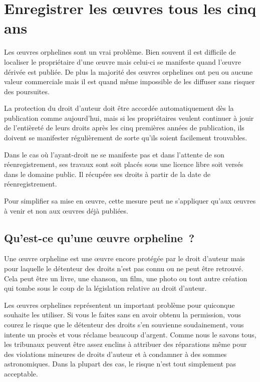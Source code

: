 \chapter{Enregistrer les œuvres tous les cinq ans}\label{registre}

Les œuvres orphelines sont un vrai problème. Bien souvent il est difficile de localiser le
propriétaire d’une œuvre mais celui-ci se manifeste quand l’œuvre dérivée est publiée. De plus la
majorité des œuvres orphelines ont peu ou aucune valeur commerciale mais il est quand même
impossible de les diffuser sans risquer des poursuites.

\begin{mesure}
 La protection du droit d’auteur doit être accordée automatiquement dès la publication comme
aujourd’hui, mais si les propriétaires veulent continuer à jouir de l'entièreté de leurs droits après les cinq
premières années de publication, ils doivent se manifester régulièrement de sorte qu’ils soient facilement
trouvables. 

Dans le cas où l'ayant-droit ne se manifeste pas et dans l'attente de son réenregistrement, ses travaux sont soit placés sous une licence libre soit versés dans le domaine public. Il récupére ses droits à partir de la date de réenregistrement.

Pour simplifier sa mise en œuvre, cette mesure peut ne s'appliquer qu'aux œuvres à venir et non aux œuvres déjà publiées.
\end{mesure}

\section{Qu'est-ce qu'une œuvre orpheline~?}

Une œuvre orpheline est une œuvre encore protégée par le droit d’auteur mais pour laquelle le
détenteur des droits n’est pas connu ou ne peut être retrouvé. Cela peut être un livre, une chanson,
un film, une photo ou tout autre création qui tombe sous le coup de la législation relative au droit
d’auteur.

Les œuvres orphelines représentent un important problème pour quiconque souhaite les utiliser. Si
vous le faites sans en avoir obtenu la permission, vous courez le risque que le détenteur des droits
s’en souvienne soudainement, vous intente un procès et vous réclame beaucoup d’argent. Comme nous le
savons tous, les tribunaux peuvent être assez enclins à attribuer des réparations même pour des
violations mineures de droits d’auteur et à condamner à des sommes astronomiques. Dans la plupart
des cas, le risque n’est tout simplement pas acceptable.

